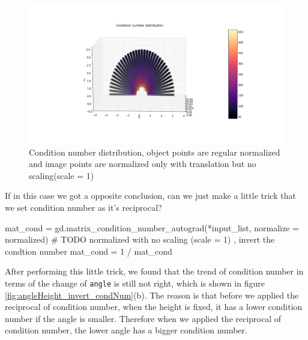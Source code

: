 \begin{figure}[H]
\hspace*{-4cm}
\centering
\includegraphics[scale=0.6]{./fig/con_dis_Imag_OnlyTrans.png}
\caption{Condition number distribution, object points are regular normalized and image points are normalized only with translation but no scaling(scale = 1)}  
\label{fig:con_dis_Imag_OnlyTrans}
\end{figure}

If in this case we got a opposite conclusion, can we just make a little trick that we set condition number as it's reciprocal?
\begin{python}\label{python:regular}
mat_cond = gd.matrix_condition_number_autograd(*input_list, normalize = normalized)
# TODO normalized with no scaling (scale = 1) , invert the condtion number
mat_cond = 1 / mat_cond
\end{python}

After performing this little trick, we found that the trend of condition number in terms of the change of \texttt{angle} is still not right, which is shown in figure \ref{fig:angleHeight_invert_condNum}(b). The reason is that before we applied the reciprocal of condition number, when the height is fixed, it has a lower condition number if the angle is smaller. Therefore when we applied the reciprocal of condition number, the lower angle has a bigger condition number.

